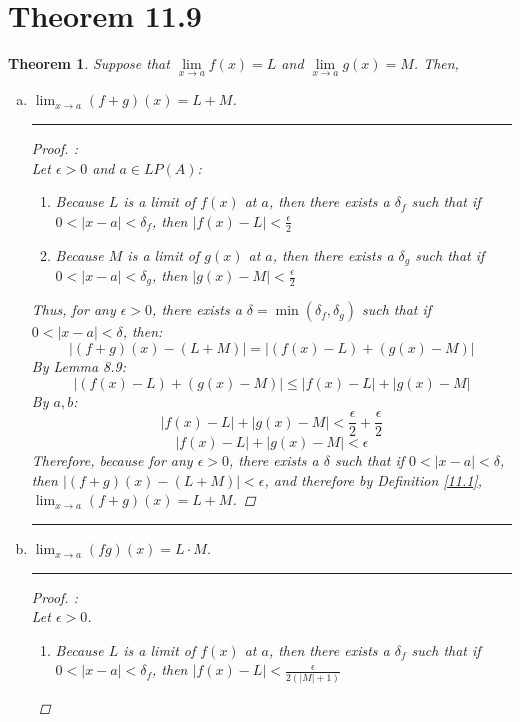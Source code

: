 \documentclass[openany, amssymb, psamsfonts]{amsart}
\newtheorem{thm}{Theorem}[section]
\theoremstyle{definition}
\numberwithin{equation}{section}
\begin{document}
\section*{Theorem 11.9}
\begin{thm}
\label{11.9}
	Suppose that $\lim\limits_{x \to a} f(x) = L$ and $\lim\limits_{x \to a} g(x) = M$. Then,
	\begin{enumerate}[(a)]
		\item \label{11.9.a} $\displaystyle\lim_{x \to a} (f + g)(x) = L + M$.
\vspace{4pt}     \hrule   \vspace{4pt}\begin{proof}:\\
Let $\epsilon >0$ and $a\in LP(A)$:
\begin{enumerate}
    \item Because $L$ is a limit of $f(x)$ at $a$, then there exists a $\delta_f$ such that if $0< |x-a|<\delta_f$, then $|f(x) - L|<\frac{\epsilon}{2}$ 
    \item Because $M$ is a limit of $g(x)$ at $a$, then there exists a $\delta_g$ such that if $0< |x-a|<\delta_g$, then $|g(x) - M|<\frac{\epsilon}{2}$ 
\end{enumerate}
Thus, for any $\epsilon>0$, there exists a $\delta = \min(\delta_f, \delta_g)$ such that if $0<|x-a|<\delta$, then:
\[|(f+g)(x) - (L+M)|  =  |(f(x) - L) + (g(x) - M)|\]
By Lemma 8.9:
\[|(f(x) - L) + (g(x) - M)| \leq |f(x) - L| + |g(x) - M|\]
By $a,b$:
\[|f(x) - L| + |g(x) - M| < \frac{\epsilon}{2}+\frac{\epsilon}{2}\]
\[|f(x) - L| + |g(x) - M| < \epsilon\]
Therefore, because for any $\epsilon >0$, there exists a $\delta$ such that if $0<|x-a|<\delta$, then $|(f+g)(x) - (L+M)| < \epsilon$, and therefore by Definition \ref{11.1}, $\displaystyle\lim_{x \to a} (f + g)(x) = L + M$.
\end{proof} \vspace{4pt}     \hrule   \vspace{4pt}
		\item \label{11.9.b} $\displaystyle\lim_{x \to a} (f g)(x) = L \cdot M$.
\vspace{4pt}     \hrule   \vspace{4pt}\begin{proof}:\\
Let $\epsilon >0$. 
\begin{enumerate}
    \item Because $L$ is a limit of $f(x)$ at $a$, then there exists a $\delta_f$ such that if $0< |x-a|<\delta_f$, then $|f(x) - L|<\frac{\epsilon}{2(|M|+1)}$ 

\end{enumerate}
\end{proof}
\end{enumerate}
\end{thm}
\end{document}
